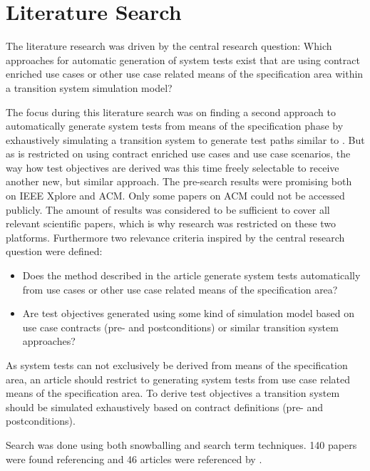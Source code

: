 \section{Literature Search} \label{literaturesearch}

The literature research was driven by the central research question: \glqq Which approaches for automatic generation of system tests exist that are using contract enriched use cases or other use case related means of the specification area within a transition system simulation model?\grqq 

The focus during this literature search was on finding a second approach to automatically generate system tests from means of the specification phase by exhaustively simulating a transition system to generate test paths similar to \cite{ClementineNebut2006}. But as \cite{ClementineNebut2006} is restricted on using contract enriched use cases and use case scenarios, the way how test objectives are derived was this time freely selectable to receive another new, but similar approach. The pre-search results were promising both on IEEE Xplore and ACM. Only some papers on ACM could not be accessed publicly. The amount of results was considered to be sufficient to cover all relevant scientific papers, which is why research was restricted on these two platforms. Furthermore two relevance criteria inspired by the central research question were defined:

\begin{itemize}
	\item Does the method described in the article generate system tests automatically from use cases or other use case related means of the specification area?
	\item Are test objectives generated using some kind of simulation model based on use case contracts (pre- and postconditions) or similar transition system approaches?
\end{itemize} 

As system tests can not exclusively be derived from means of the specification area, an article should restrict to generating system tests from use case related means of the specification area. To derive test objectives a transition system should be simulated exhaustively based on contract definitions (pre- and postconditions). 

Search was done using both snowballing and search term techniques. 140 papers were found referencing \cite{ClementineNebut2006} and 46 articles were referenced by \cite{ClementineNebut2006}. 

